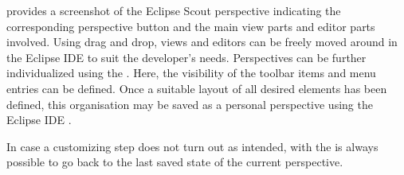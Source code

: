 \documentclass[a4paper,10pt,twoside]{book}
\begin{document}
 provides a screenshot of the Eclipse Scout perspective indicating the corresponding perspective button and the main view parts and editor parts involved. 
Using drag and drop, views and editors can be freely moved around in the Eclipse IDE to suit the developer's needs.
Perspectives can be further individualized using the . 
Here, the visibility of the toolbar items and menu entries can be defined. 
Once a suitable layout of all desired elements has been defined, this organisation may be saved as a personal perspective using the Eclipse IDE .

In case a customizing step does not turn out as intended, with the  is always possible to go back to the last saved state of the current perspective.
  
\ifx\wholebook\relax\else
   
   
\end{document}
